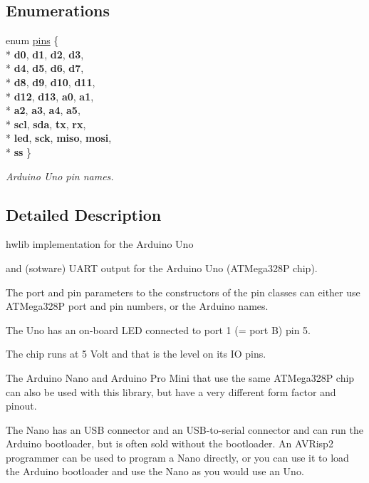 \subsection*{Enumerations}
\begin{DoxyCompactItemize}
\item 
enum \hyperlink{namespaceuno_a0a859f3512bcc3027a090ae07befd5b2}{pins} \{ \\*
{\bfseries d0}, 
{\bfseries d1}, 
{\bfseries d2}, 
{\bfseries d3}, 
\\*
{\bfseries d4}, 
{\bfseries d5}, 
{\bfseries d6}, 
{\bfseries d7}, 
\\*
{\bfseries d8}, 
{\bfseries d9}, 
{\bfseries d10}, 
{\bfseries d11}, 
\\*
{\bfseries d12}, 
{\bfseries d13}, 
{\bfseries a0}, 
{\bfseries a1}, 
\\*
{\bfseries a2}, 
{\bfseries a3}, 
{\bfseries a4}, 
{\bfseries a5}, 
\\*
{\bfseries scl}, 
{\bfseries sda}, 
{\bfseries tx}, 
{\bfseries rx}, 
\\*
{\bfseries led}, 
{\bfseries sck}, 
{\bfseries miso}, 
{\bfseries mosi}, 
\\*
{\bfseries ss}
 \}\begin{DoxyCompactList}\small\item\em Arduino Uno pin names. \end{DoxyCompactList}
\end{DoxyCompactItemize}


\subsection{Detailed Description}
hwlib implementation for the Arduino Uno 

 and (sotware) U\+A\+RT output for the Arduino Uno (A\+T\+Mega328P chip).

The port and pin parameters to the constructors of the pin classes can either use A\+T\+Mega328P port and pin numbers, or the Arduino names.

The Uno has an on-\/board L\+ED connected to port 1 (= port B) pin 5.

The chip runs at 5 Volt and that is the level on its IO pins.



The Arduino Nano and Arduino Pro Mini that use the same A\+T\+Mega328P chip can also be used with this library, but have a very different form factor and pinout.

The Nano has an U\+SB connector and an U\+S\+B-\/to-\/serial connector and can run the Arduino bootloader, but is often sold without the bootloader. An A\+V\+Risp2 programmer can be used to program a Nano directly, or you can use it to load the Arduino bootloader and use the Nano as you would use an Uno.



